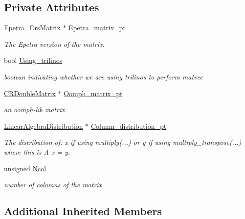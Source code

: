 \subsection*{Private Attributes}
\begin{DoxyCompactItemize}
\item 
Epetra\+\_\+\+Crs\+Matrix $\ast$ \hyperlink{classoomph_1_1MatrixVectorProduct_a14264b497811bc0d959be7f3022cd4d2}{Epetra\+\_\+matrix\+\_\+pt}
\begin{DoxyCompactList}\small\item\em The Epetra version of the matrix. \end{DoxyCompactList}\item 
bool \hyperlink{classoomph_1_1MatrixVectorProduct_ad912d5eeef011117feef7af1cabeb631}{Using\+\_\+trilinos}
\begin{DoxyCompactList}\small\item\em boolean indicating whether we are using trilinos to perform matvec \end{DoxyCompactList}\item 
\hyperlink{classoomph_1_1CRDoubleMatrix}{C\+R\+Double\+Matrix} $\ast$ \hyperlink{classoomph_1_1MatrixVectorProduct_a3932cd524581a670528ee807bf28ff1a}{Oomph\+\_\+matrix\+\_\+pt}
\begin{DoxyCompactList}\small\item\em an oomph-\/lib matrix \end{DoxyCompactList}\item 
\hyperlink{classoomph_1_1LinearAlgebraDistribution}{Linear\+Algebra\+Distribution} $\ast$ \hyperlink{classoomph_1_1MatrixVectorProduct_a986b1f7596b96329644f082b3303e28a}{Column\+\_\+distribution\+\_\+pt}
\begin{DoxyCompactList}\small\item\em The distribution of\+: x if using multiply(...) or y if using multiply\+\_\+transpose(...) where this is A x = y. \end{DoxyCompactList}\item 
unsigned \hyperlink{classoomph_1_1MatrixVectorProduct_ade21a9a8255e6adab4ff367d3716f851}{Ncol}
\begin{DoxyCompactList}\small\item\em number of columns of the matrix \end{DoxyCompactList}\end{DoxyCompactItemize}
\subsection*{Additional Inherited Members}


